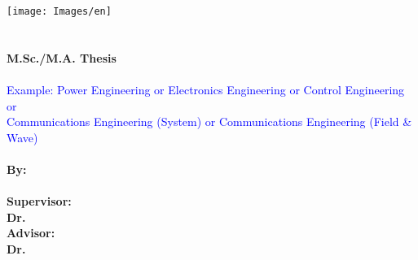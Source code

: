 \newpage
\begin{center}
\begin{latin}
\doublespacing
\thispagestyle{empty}
\texttt{[image: Images/en]} 
\\
{\FontEnb \bfseries \enUni}
\\
{\FontEnb \bfseries \enDep}
\\[2cm]
{\FontEnc \bfseries   M.Sc./M.A. Thesis}
\\
{\FontEnc \bfseries \enmajor}
\\%
\textcolor{blue}{Example: Power Engineering or Electronics Engineering or Control Engineering or \\
Communications Engineering (System) or Communications Engineering (Field \& Wave)}
\\[1cm]
{\FontEnf \bfseries \entitle}
\\[2cm]
{\FontEnc\bfseries By:}
\\
{\FontEnc\bfseries \enAuthor}
\\[1cm]
{\FontEnc \bfseries Supervisor:}
\\
{\FontEnc \bfseries Dr. \ensupervisor}
\\[1cm]
{\FontEnc\bfseries Advisor:}
\\
{\FontEnc \bfseries Dr. \enadvisor}
\\[2cm]
{\FontEnb\bfseries \engdate}
\end{latin}
\end{center}